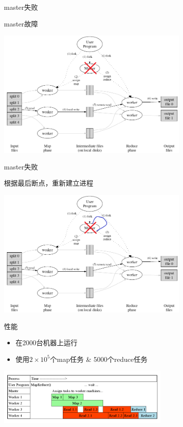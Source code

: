 \documentclass{beamer}
\begin{document}
\begin{frame}{master失败}
    \begin{block}{master故障}
    \begin{center} \includegraphics[height=180pt]{keyan/mapreduce_master_wrong.png} \end{center}
    \end{block}
\end{frame}
\begin{frame}{master失败}
    \begin{block}{根据最后断点，重新建立进程}
    \begin{center} \includegraphics[height=180pt]{keyan/mapreduce_master_wrong2.png} \end{center}
    \end{block}
\end{frame}

\begin{frame}{性能}
\begin{itemize}
    \item 在2000台机器上运行
    \item 使用$2\times 10^5$个map任务 \& 5000个reduce任务
\end{itemize} 
\centerline{\includegraphics[height=80pt]{keyan/pp.png} }
\end{frame}
\end{document}
